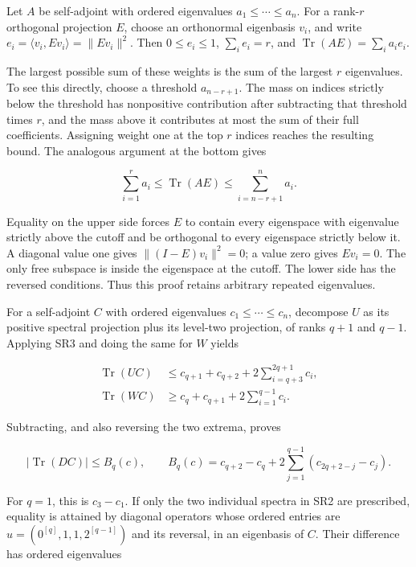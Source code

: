 \documentclass{article}
\begin{document}
Let \(A\) be self-adjoint with ordered eigenvalues \(a_1\le\cdots\le a_n\). For a rank-\(r\) orthogonal projection \(E\), choose an orthonormal eigenbasis \(v_i\), and write \(e_i=\langle v_i,Ev_i\rangle=\|Ev_i\|^2\). Then \(0\le e_i\le1\), \(\sum_i e_i=r\), and \(\operatorname{Tr}(AE)=\sum_i a_ie_i\).

The largest possible sum of these weights is the sum of the largest \(r\) eigenvalues. To see this directly, choose a threshold \(a_{n-r+1}\). The mass on indices strictly below the threshold has nonpositive contribution after subtracting that threshold times \(r\), and the mass above it contributes at most the sum of their full coefficients. Assigning weight one at the top \(r\) indices reaches the resulting bound. The analogous argument at the bottom gives

\[
\sum_{i=1}^{r}a_i\le\operatorname{Tr}(AE)
\le\sum_{i=n-r+1}^{n}a_i.
\tag{SR3}
\]

Equality on the upper side forces \(E\) to contain every eigenspace with eigenvalue strictly above the cutoff and be orthogonal to every eigenspace strictly below it. A diagonal value one gives \(\|(I-E)v_i\|^2=0\); a value zero gives \(Ev_i=0\). The only free subspace is inside the eigenspace at the cutoff. The lower side has the reversed conditions. Thus this proof retains arbitrary repeated eigenvalues.

For a self-adjoint \(C\) with ordered eigenvalues \(c_1\le\cdots\le c_n\), decompose \(U\) as its positive spectral projection plus its level-two projection, of ranks \(q+1\) and \(q-1\). Applying SR3 and doing the same for \(W\) yields

\[
\begin{aligned}
\operatorname{Tr}(UC)&\le c_{q+1}+c_{q+2}
+2\sum_{i=q+3}^{2q+1}c_i,\\
\operatorname{Tr}(WC)&\ge c_q+c_{q+1}
+2\sum_{i=1}^{q-1}c_i.
\end{aligned}
\tag{SR4}
\]

Subtracting, and also reversing the two extrema, proves

\[
|\operatorname{Tr}(DC)|\le B_q(c),\qquad
B_q(c)=c_{q+2}-c_q+
2\sum_{j=1}^{q-1}(c_{2q+2-j}-c_j).
\tag{SR5}
\]

For \(q=1\), this is \(c_3-c_1\). If only the two individual spectra in SR2 are prescribed, equality is attained by diagonal operators whose ordered entries are \(u=(0^{[q]},1,1,2^{[q-1]})\) and its reversal, in an eigenbasis of \(C\). Their difference has ordered eigenvalues
\end{document}
